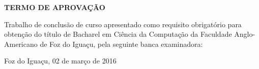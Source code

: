 \begin{folhadeaprovacao} %
\begin{center}
	\vspace*{1cm}  
  	\large\textbf{TERMO DE APROVAÇÃO}
  	
  	\vspace*{1cm} %
  	{\large\textbf\imprimirautor}

   \vspace*{1cm} %
    {\large\textbf\imprimirtitulo}   
 \end{center}     
  
	
	\hspace{.4\textwidth}
	\SingleSpace\noindent\normalsize{Trabalho de conclusão de curso apresentado como requisito obrigatório para obtenção do título de Bacharel em Ciência da Computação da Faculdade Anglo-Americano de Foz do Iguaçu, pela seguinte banca examinadora:}
   
    
  
   \vspace*{0.5cm}  %
   \vspace*{2.5cm}
   \begin{center}
   	{Foz do Iguaçu, 02 de março de 2016}
   \end{center}
   
 
\end{folhadeaprovacao}